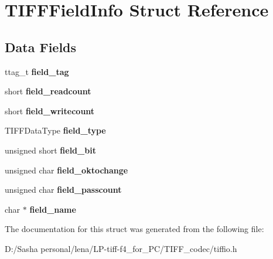 \hypertarget{struct_t_i_f_f_field_info}{}\section{T\+I\+F\+F\+Field\+Info Struct Reference}
\label{struct_t_i_f_f_field_info}
\subsection*{Data Fields}
\begin{DoxyCompactItemize}
\item 
\hypertarget{struct_t_i_f_f_field_info_a44a0f57f2eb58a24c9442c66e112be0e}{}ttag\+\_\+t {\bfseries field\+\_\+tag}\label{struct_t_i_f_f_field_info_a44a0f57f2eb58a24c9442c66e112be0e}

\item 
\hypertarget{struct_t_i_f_f_field_info_ac70a09d7c8145dc250f1a248c3f2c076}{}short {\bfseries field\+\_\+readcount}\label{struct_t_i_f_f_field_info_ac70a09d7c8145dc250f1a248c3f2c076}

\item 
\hypertarget{struct_t_i_f_f_field_info_acce9397b4e3202936f173de755016a67}{}short {\bfseries field\+\_\+writecount}\label{struct_t_i_f_f_field_info_acce9397b4e3202936f173de755016a67}

\item 
\hypertarget{struct_t_i_f_f_field_info_adcbe4fb42526544f194fdbdafc5bd07c}{}T\+I\+F\+F\+Data\+Type {\bfseries field\+\_\+type}\label{struct_t_i_f_f_field_info_adcbe4fb42526544f194fdbdafc5bd07c}

\item 
\hypertarget{struct_t_i_f_f_field_info_aa9de1aeb999a82556bf96d28dd49b2a6}{}unsigned short {\bfseries field\+\_\+bit}\label{struct_t_i_f_f_field_info_aa9de1aeb999a82556bf96d28dd49b2a6}

\item 
\hypertarget{struct_t_i_f_f_field_info_a4b973eabd1f78297fe8213684610c524}{}unsigned char {\bfseries field\+\_\+oktochange}\label{struct_t_i_f_f_field_info_a4b973eabd1f78297fe8213684610c524}

\item 
\hypertarget{struct_t_i_f_f_field_info_a921d57a57daa0f9f6ccb853e57c651d8}{}unsigned char {\bfseries field\+\_\+passcount}\label{struct_t_i_f_f_field_info_a921d57a57daa0f9f6ccb853e57c651d8}

\item 
\hypertarget{struct_t_i_f_f_field_info_acd2269a44a3f004f7932c866d892da9a}{}char $\ast$ {\bfseries field\+\_\+name}\label{struct_t_i_f_f_field_info_acd2269a44a3f004f7932c866d892da9a}

\end{DoxyCompactItemize}


The documentation for this struct was generated from the following file\+:\begin{DoxyCompactItemize}
\item 
D\+:/\+Sasha personal/lena/\+L\+P-\/tiff-\/f4\+\_\+for\+\_\+\+P\+C/\+T\+I\+F\+F\+\_\+codec/tiffio.\+h\end{DoxyCompactItemize}
